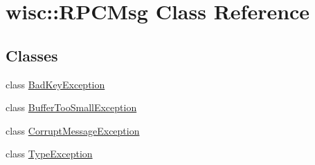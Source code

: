 \hypertarget{classwisc_1_1RPCMsg}{
\section{wisc::RPCMsg Class Reference}
\label{classwisc_1_1RPCMsg}
}
\subsection*{Classes}
\begin{DoxyCompactItemize}
\item 
class \hyperlink{classwisc_1_1RPCMsg_1_1BadKeyException}{BadKeyException}
\item 
class \hyperlink{classwisc_1_1RPCMsg_1_1BufferTooSmallException}{BufferTooSmallException}
\item 
class \hyperlink{classwisc_1_1RPCMsg_1_1CorruptMessageException}{CorruptMessageException}
\item 
class \hyperlink{classwisc_1_1RPCMsg_1_1TypeException}{TypeException}
\end{DoxyCompactItemize}
